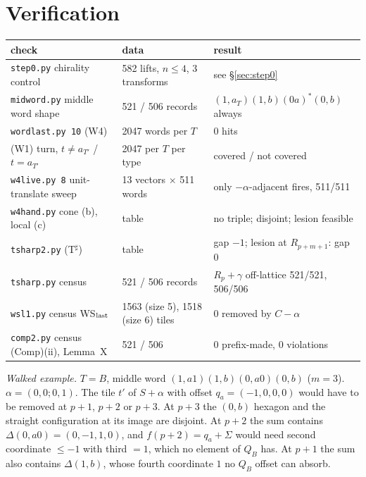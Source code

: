 \documentclass[11pt]{article}
\theoremstyle{definition}\newtheorem{definition}[theorem]{Definition}\newtheorem{remark}[theorem]{Remark}
\begin{document}
\section{Verification}\label{sec:ver}
\begin{center}\small\begin{tabular}{lll}\toprule
check & data & result\\\midrule
\texttt{step0.py} chirality control & 582 lifts, $n\le4$, 3 transforms & see \S\ref{sec:step0}\\
\texttt{midword.py} middle word shape & 521 / 506 records & $(1,a_T)(1,b)(0a)^{\ast}(0,b)$ always\\
\texttt{wordlast.py 10} (W4) & 2047 words per $T$ & 0 hits\\
\quad (W1) turn, $t\ne a_{T'}$ / $t=a_{T'}$ & 2047 per $T$ per type & covered / not covered\\
\texttt{w4live.py 8} unit-translate sweep & 13 vectors $\times$ 511 words & only $-\alpha$-adjacent fires, 511/511\\
\texttt{w4hand.py} cone (b), local (c) & table & no triple; disjoint; lesion feasible\\
\texttt{tsharp2.py} (T$^\sharp$) & table & gap $-1$; lesion at $R_{p+m+1}$: gap 0\\
\texttt{tsharp.py} census & 521 / 506 records & $R_p+\gamma$ off-lattice 521/521, 506/506\\
\texttt{wsl1.py} census WS$_{\rm last}$ & 1563 (size 5), 1518 (size 6) tiles & 0 removed by $C-\alpha$\\
\texttt{comp2.py} census (Comp)(ii), Lemma~X & 521 / 506 & 0 prefix-made, 0 violations\\\bottomrule
\end{tabular}\end{center}
\emph{Walked example.} $T=B$, middle word $(1,a1)(1,b)(0,a0)(0,b)$ ($m=3$). $\alpha=(0,0;0,1)$. The tile $t'$ of $S+\alpha$ with offset $q_a=(-1,0,0,0)$ would have to be removed at $p+1$, $p+2$ or $p+3$. At $p+3$ the $(0,b)$ hexagon and the straight configuration at its image are disjoint. At $p+2$ the sum contains $\Delta(0,a0)=(0,-1,1,0)$, and $f(p+2)=q_a+\Sigma$ would need second coordinate $\le-1$ with third $=1$, which no element of $Q_B$ has. At $p+1$ the sum also contains $\Delta(1,b)$, whose fourth coordinate $1$ no $Q_B$ offset can absorb.
\end{document}
